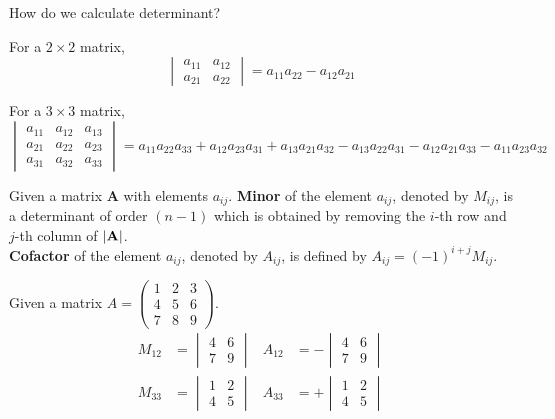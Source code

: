 \documentclass{huhtakm-template-book}
\begin{document}
How do we calculate determinant?
\begin{defn}
    For a $2\times 2$ matrix,
    \begin{equation*}
        \begin{vmatrix}
        a_{11} & a_{12}\\
        a_{21} & a_{22}
    \end{vmatrix}=a_{11}a_{22}-a_{12}a_{21}
    \end{equation*}
\end{defn}
\newpage
\begin{defn}
    For a $3\times 3$ matrix,
    \begin{equation*}
        \begin{vmatrix}
            a_{11} & a_{12} & a_{13}\\
            a_{21} & a_{22} & a_{23}\\
            a_{31} & a_{32} & a_{33}
        \end{vmatrix}=a_{11}a_{22}a_{33}+a_{12}a_{23}a_{31}+a_{13}a_{21}a_{32}-a_{13}a_{22}a_{31}-a_{12}a_{21}a_{33}-a_{11}a_{23}a_{32}
    \end{equation*}
\end{defn}
\begin{defn}
    Given a matrix $\mathbf{A}$ with elements $a_{ij}$. \textbf{Minor} of the element $a_{ij}$, denoted by $M_{ij}$, is a determinant of order $(n-1)$ which is obtained by removing the $i$-th row and $j$-th column of $\left|{\mathbf{A}}\right|$.\\
    \textbf{Cofactor} of the element $a_{ij}$, denoted by $A_{ij}$, is defined by $A_{ij}=(-1)^{i+j}M_{ij}$.
\end{defn}
\begin{eg}
    Given a matrix $A=\begin{pmatrix}
        1 & 2 & 3\\
        4 & 5 & 6\\
        7 & 8 & 9
    \end{pmatrix}$.
    \begin{align*}
        M_{12}&=\begin{vmatrix}
            4 & 6\\
            7 & 9
        \end{vmatrix} & A_{12}&=-\begin{vmatrix}
            4 & 6\\
            7 & 9
        \end{vmatrix}\\
        M_{33}&=\begin{vmatrix}
            1 & 2\\
            4 & 5
        \end{vmatrix} & A_{33}&=+\begin{vmatrix}
            1 & 2\\
            4 & 5
        \end{vmatrix}
    \end{align*}
\end{eg}
\end{document}

